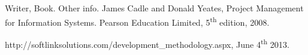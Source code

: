 
\renewcommand{\refname}{\title{Bibliography}}
\begin{thebibliography}{}
Writer,
Book. Other info.
James Cadle and Donald Yeates,
Project Management
for Information Systems. Pearson Education Limited, 5\textsuperscript{th} edition, 2008.

http://softlinksolutions.com/development\_methodology.aspx, June 4\textsuperscript{th} 2013.
\end{thebibliography}
\newpage